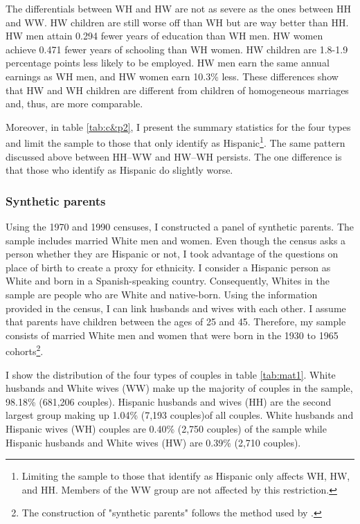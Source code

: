 \documentclass[12pt, fullpage]{article}
\begin{document}
The differentials between WH and HW are not as severe as the ones between HH and WW. HW children are still worse off than WH but are way better than HH. HW men attain 0.294 fewer years of education than WH men. HW women achieve 0.471 fewer years of schooling than WH women. HW children are 1.8-1.9 percentage points less likely to be employed. HW men earn the same annual earnings as WH men, and HW women earn 10.3\% less. These differences show that HW and WH children are different from children of homogeneous marriages and, thus, are more comparable.

Moreover, in table \ref{tab:c&p2}, I present the summary statistics for the four types and limit the sample to those that only identify as Hispanic\footnote{Limiting the sample to those that identify as Hispanic only affects WH, HW, and HH. Members of the WW group are not affected by this restriction.}. The same pattern discussed above between HH--WW and HW--WH persists. The one difference is that those who identify as Hispanic do slightly worse.
 
\subsubsection{Synthetic parents}

Using the 1970 and 1990 censuses, I constructed a panel of synthetic parents. The sample includes married White men and women. Even though the census asks a person whether they are Hispanic or not, I took advantage of the questions on place of birth to create a proxy for ethnicity. I consider a Hispanic person as White and born in a Spanish-speaking country. Consequently, Whites in the sample are people who are White and native-born. Using the information provided in the census, I can link husbands and wives with each other. I assume that parents have children between the ages of 25 and 45. Therefore, my sample consists of married White men and women that were born in the 1930 to 1965 cohorts\footnote{The construction of "synthetic parents" follows the method used by \citet{rubinstein2014pride}.}.

I show the distribution of the four types of couples in table \ref{tab:mat1}. White husbands and White wives (WW) make up the majority of couples in the sample, 98.18\% (681,206 couples). Hispanic husbands and wives (HH) are the second largest group making up 1.04\% (7,193 couples)of all couples. White husbands and Hispanic wives (WH) couples are 0.40\% (2,750 couples) of the sample while Hispanic husbands and White wives (HW) are 0.39\% (2,710 couples). 
\end{document}

